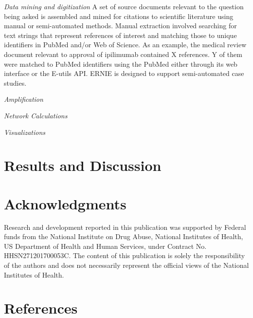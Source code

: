 \documentclass[review]{elsarticle}
\begin{document}
\emph{Data mining and digitization} A set of source documents relevant to the question being asked is assembled and mined for citations to scientific literature using manual or semi-automated methods. Manual extraction involved searching for text strings that represent references of interest and matching those to unique identifiers in PubMed and/or Web of Science. As an example, the medical review document relevant to approval of ipilimumab contained X references. Y of them were matched to PubMed identifiers using the PubMed either through its web interface or the E-utils API. ERNIE is designed to support semi-automated case studies.

\emph{Amplification}

\emph{Network Calculations}

\emph{Visualizations}

\section*{Results and Discussion}
\section*{Acknowledgments} Research and development reported in this publication was supported by Federal funds from the National Institute on Drug Abuse, National Institutes of Health, US Department of Health and Human Services, under Contract No. HHSN271201700053C. The content of this publication is solely the responsibility of the authors and does not necessarily represent the official views of the National Institutes of Health.


\section*{References}


\end{document}
